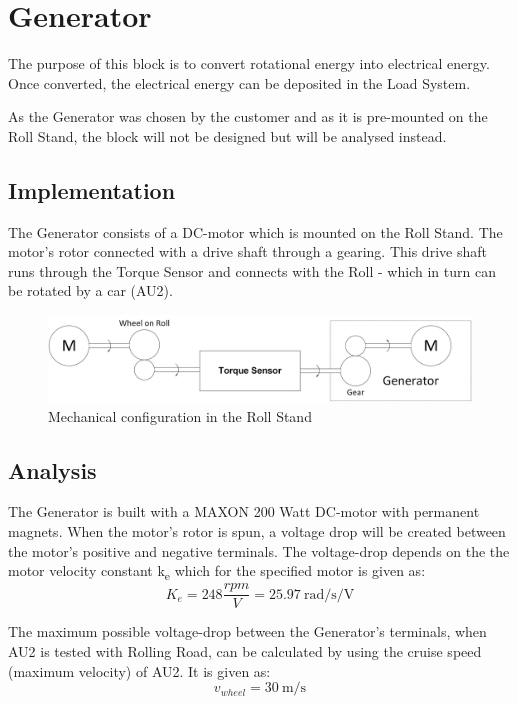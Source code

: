 \newpage
\section{Generator}
The purpose of this block is to convert rotational energy into electrical energy. Once converted, the electrical energy can be deposited in the Load System.

As the Generator was chosen by the customer and as it is pre-mounted on the Roll Stand, the block will not be designed but will be analysed instead.

\subsection{Implementation}
The Generator consists of a DC-motor which is mounted on the Roll Stand. The motor's rotor connected with a drive shaft through a gearing. This drive shaft runs through the Torque Sensor and connects with the Roll - which in turn can be rotated by a car (AU2).

\begin{figure}[H]
	\centering
	\includegraphics[width=1\linewidth]{Hardware/Pictures/Mechanical_Connections}
	\caption{Mechanical configuration in the Roll Stand}
	\label{fig:Generator_Implementation}
\end{figure}

\subsection{Analysis}
\label{sec:GeneratorAnalysis}
The Generator is built with a MAXON 200 Watt DC-motor with permanent magnets\cite{Maxon}. When the motor's rotor is spun, a voltage drop will be created between the motor's positive and negative terminals. The voltage-drop depends on the the motor velocity constant k\textsubscript{e} which for the specified motor is given as:
\begin{equation}
	K_e = 248 \frac{rpm}{V} = \SI[per-mode=fraction]{25.97}{\radian \per \second \per \volt}
\end{equation}

The maximum possible voltage-drop between the Generator's terminals, when AU2 is tested with Rolling Road, can be calculated by using the cruise speed (maximum velocity) of AU2\cite{BAC_zenith33}. It is given as:
\begin{equation}
	v_{wheel} = \SI[per-mode=fraction]{30}{\meter \per \second}
\end{equation}

